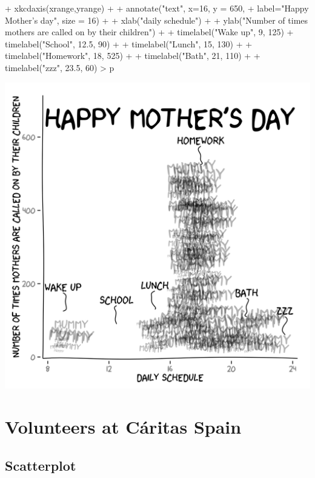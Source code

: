 \documentclass[10pt]{article}
\begin{document}
\begin{center}
\begin{Schunk}
\begin{Sinput}
{+   xkcdaxis(xrange,yrange) +
+   annotate("text", x=16, y = 650,
+            label="Happy Mother's day", size = 16) +
+   xlab("daily schedule") +
+   ylab("Number of times mothers are called on by their children") +
+   timelabel("Wake up", 9, 125) + timelabel("School", 12.5, 90) +
+   timelabel("Lunch", 15, 130) +
+   timelabel("Homework", 18, 525) +
+   timelabel("Bath", 21, 110) +
+   timelabel("zzz", 23.5, 60)}
> p
\end{Sinput}
\end{Schunk}
\includegraphics{xkcd-intro-motherday}

\end{center}
\section{Volunteers at C\'aritas Spain}

\subsection{Scatterplot}
\end{document}
